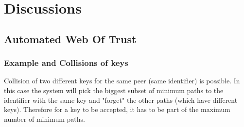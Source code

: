 \documentclass[]{article}
\begin{document}
\section{Discussions}

\subsection{Automated Web Of Trust}

\subsubsection{Example and Collisions of keys}
\label{sec:example-collision}
Collision of two different keys for the same peer (same identifier) is possible. In this case the system will pick the biggest subset of minimum paths to the identifier with the same key and "forget" the other paths (which have different keys). Therefore for a key to be accepted, it has to be part of the maximum number of minimum paths.
\end{document}
